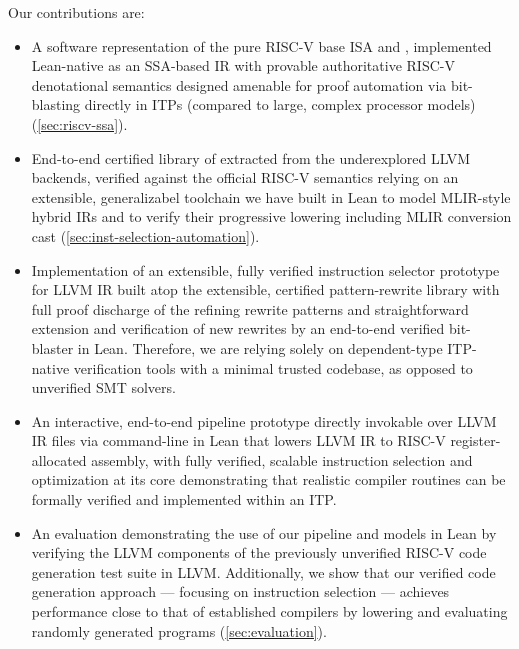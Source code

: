 \documentclass[review, anonymous, acmsmall, screen]{acmart}
\begin{document}
\vspace{.5em}
\noindent
Our contributions are:
\begin{itemize}
\item A software representation of the pure RISC-V base ISA and , implemented Lean-native
 as an SSA-based IR with provable authoritative RISC-V denotational semantics designed amenable for
  proof automation via bit-blasting directly in ITPs (compared to large, complex processor models)
  (\autoref{sec:riscv-ssa}).

\item End-to-end certified library of  extracted from
 the underexplored LLVM backends, verified against the official RISC-V semantics relying on an extensible,
  generalizabel toolchain we have built in Lean to model MLIR-style hybrid IRs and to verify their progressive
   lowering including MLIR conversion cast (\autoref{sec:inst-selection-automation}).

\item Implementation of an extensible, fully verified instruction selector prototype for LLVM IR built
 atop the extensible, certified pattern-rewrite library with full proof discharge of the refining 
 rewrite patterns and straightforward extension and verification of new rewrites by an end-to-end verified 
 bit-blaster in Lean. Therefore, we are relying solely on dependent-type ITP-native verification tools
  with a minimal trusted codebase, as opposed to unverified SMT solvers.

\item An interactive, end-to-end pipeline prototype directly invokable over LLVM IR files via 
command-line in Lean that lowers  LLVM IR to RISC-V register-allocated assembly, with fully verified,
 scalable instruction selection and optimization at its core  demonstrating that realistic compiler 
 routines can be formally verified and implemented within an ITP.

\item An evaluation demonstrating the use of our pipeline and models in Lean by verifying the LLVM 
components of the previously unverified RISC-V code generation test suite in LLVM. Additionally, we 
show that our verified code generation approach — focusing on instruction selection — achieves performance 
close to that of established compilers by lowering and evaluating \sarah[XY]{} randomly generated programs
 (\autoref{sec:evaluation}).
\end{itemize}
\end{document}
